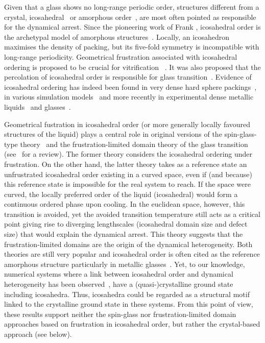 Given that a glass shows no long-range periodic order, structures different from a crystal, icosahedral~\cite{steinhardt1983boo,sadoc1999geometrical, tarjus2005fba} or amorphous order~\cite{lubchenko2007}, are most often pointed as responsible for the dynamical arrest. Since the pioneering work of Frank \cite{Frank1952}, icosahedral order is the archetypal model of amorphous structures~\citep{Spaepen2000}. Locally, an icosahedron maximises the density of packing, but its five-fold symmetry is incompatible with long-range periodicity. Geometrical frustration associated with icosahedral ordering is proposed to be crucial for vitrification ~\cite{steinhardt1983boo,sadoc1999geometrical,tarjus2005fba}. It was also proposed that the percolation of icosahedral order is responsible for glass transition~\cite{Tomida1995}.  Evidence of icosahedral ordering has indeed been found in very dense hard sphere packings~\citep{Bernal1960,Clarke1993, Anikeenko2007,Malshe2011,Charbonneau}, in various simulation models~\citep{steinhardt1983boo,Tomida1995,Doye2003,Pedersen2010,Coslovich2011} and more recently in experimental dense metallic liquids~\citep{Reichert2000,Celino2007} and glasses~\citep{Luo2004,Wang2011}.

Geometrical fustration in icosahedral order (or more generally locally favoured structures of the liquid) plays a central role in original versions of the spin-glass-type theory~\cite{steinhardt1983boo,sadoc1999geometrical} and the frustration-limited domain theory of the glass transition (see~\citep{tarjus2005fba} for a review). The former theory considers the icosahedral ordering under frustration. On the other hand, the latter theory takes as a reference state an unfrustrated icosahedral order existing in a curved space, even if (and because) this reference state is impossible for the real system to reach. If the space were curved, the locally preferred order of the liquid (icosahedral) would form a continuous ordered phase upon cooling. In the  euclidean space, however, this transition is avoided, yet the avoided transition temperature still acts as a critical point giving rise to diverging lengthscales (icosahedral domain size and defect size) that would explain the dynamical arrest. This theory suggests that the frustration-limited domains are the origin of the dynamical heterogeneity. Both theories are still very popular and icosahedral order is often cited as the reference amorphous structure particularly in metallic glasses~\citep{Reichert2000, Celino2007, Luo2004, Wang2011}. Yet, to our knowledge, numerical systems where a link between icosahedral order and dynamical heterogeneity has been observed~\citep{Doye2003, Pedersen2010, Coslovich2011}, have a (quasi-)crystalline ground state including icosahedra. Thus, icosahedra could be regarded as a structural motif linked to the crystalline ground state in these systems. From this point of view, these results support neither the spin-glass nor frustration-limited domain approaches based on frustration in icosahedral order, but rather the crystal-based approach (see below).

